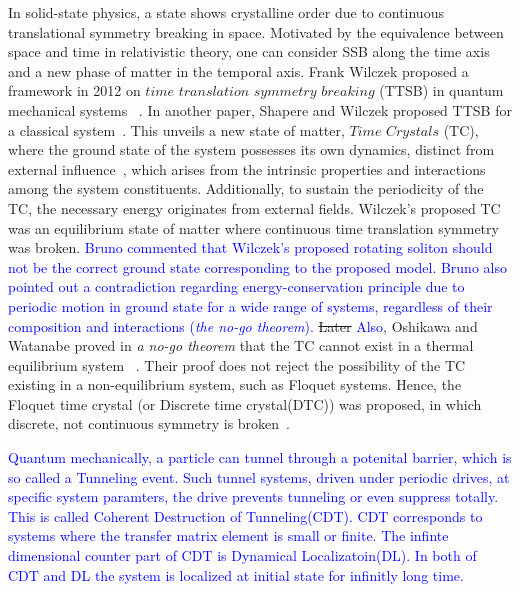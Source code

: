 \documentclass[%
reprint,
superscriptaddress,
amsmath,amssymb,showkeys,
aps,
prb,
]{revtex4-2}
\newcommand{\blue}[1]{\textcolor{blue}{#1}}
\begin{document}
	\blue{}
	
	In solid-state physics, a state shows crystalline order due to continuous translational symmetry breaking in space. Motivated by the equivalence between space and time in relativistic theory, one can consider SSB along the time axis and a new phase of matter in the temporal axis. Frank Wilczek proposed a framework in 2012 on  $\textit{time translation symmetry breaking}$ (TTSB) in quantum mechanical systems ~\cite{wilczek_quantum_2012}. In another paper, Shapere and Wilczek proposed TTSB for a classical system~\cite{shapere_classical_2012}. This unveils a new state of matter, $\textit{Time Crystals}$ (TC), where the ground state of the system possesses its own dynamics, distinct from external influence~\cite{wilczek_quantum_2012}, which arises from the intrinsic properties and interactions among the system constituents. Additionally, to sustain the periodicity of the TC, the necessary energy originates from external fields. Wilczek's proposed TC was an equilibrium state of matter where continuous time translation symmetry was broken. \blue{Bruno commented that Wilczek's proposed rotating soliton should not be the correct ground state  corresponding to the proposed model\cite{Bruno_comment_1}. Bruno also pointed out a contradiction regarding energy-conservation principle due to periodic motion in ground state for a wide range of systems, regardless of their composition and interactions (\textit{the no-go theorem})\cite{Bruno2013}.} \sout{Later} \blue{Also}, Oshikawa and Watanabe proved in \textit{a no-go theorem } that the TC cannot exist in a thermal equilibrium system ~\cite{watanabe_absence_2015}. Their proof does not reject the possibility of the TC  existing in a non-equilibrium system, such as Floquet systems. Hence, the Floquet time crystal (or Discrete time crystal(DTC)) was proposed, in which discrete, not continuous symmetry is broken~\cite{else_floquet_2016}.
	
	\blue{Quantum mechanically, a particle can tunnel through a potenital barrier, which is so called a Tunneling event. Such tunnel systems, driven under periodic drives, at specific system paramters, the drive prevents tunneling or even suppress totally. This is called Coherent Destruction of Tunneling(CDT)\cite{Grossmann1991}. CDT corresponds to systems where the transfer matrix element is small or finite.  The infinte dimensional counter part of CDT is Dynamical Localizatoin(DL). In both of CDT and DL the system is localized at initial state for infinitly long time\cite{Kayanuma2008}.}
	
\end{document}
